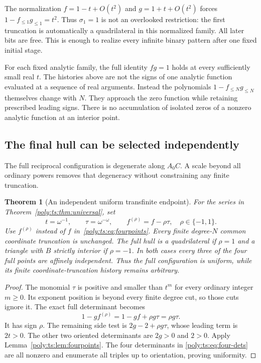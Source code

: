\documentclass[11pt,a4paper]{article}
\numberwithin{equation}{section}
\newtheorem{theorem}{Theorem}[section]
\theoremstyle{plain}
\begin{document}
\begin{remark}
The normalization $f=1-t+O(t^2)$ and $g=1+t+O(t^2)$ forces
$1-f_{\le1}g_{\le1}=t^2$. Thus $\sigma_1=1$ is not an overlooked
restriction: the first truncation is automatically a quadrilateral in
this normalized family. All later bits are free. This is enough to
realize every infinite binary pattern after one fixed initial stage.
\end{remark}

\begin{remark}
For each fixed analytic family, the full identity $fg=1$ holds at every
sufficiently small real $t$. The histories above are not the signs of one
analytic function evaluated at a sequence of real arguments. Instead the
polynomials $1-f_{\le N}g_{\le N}$ themselves change with $N$. They
approach the zero function while retaining prescribed leading signs.
There is no accumulation of isolated zeros of a nonzero analytic function
at an interior point.
\end{remark}

\subsection{The final hull can be selected independently}
The full reciprocal configuration is degenerate along $A_0C$. A scale
beyond all ordinary powers removes that degeneracy without constraining
any finite truncation.

\begin{theorem}[An independent uniform transfinite endpoint]\label{poly:ts:thm:transfinite}
For the series in Theorem~\ref{poly:ts:thm:universal}, set
\[
 t=\omega^{-1},\qquad \tau=\omega^{-\omega},\qquad
 f^{(\rho)}=f-\rho\tau,\quad \rho\in\{-1,1\}.
\]
Use $f^{(\rho)}$ instead of $f$ in~\eqref{poly:ts:eq:fourpoints}. Every finite
degree-$N$ common coordinate truncation is unchanged. The full hull is a
quadrilateral if $\rho=1$ and a triangle with $B$ strictly interior if
$\rho=-1$. In both cases every three of the four full points are affinely
independent. Thus the full configuration is uniform, while its finite
coordinate-truncation history remains arbitrary.
\end{theorem}
\begin{proof}
The monomial $\tau$ is positive and smaller than $t^m$ for every ordinary
integer $m\ge0$. Its exponent position is beyond every finite degree cut,
so those cuts ignore it. The exact full determinant becomes
\[
 1-gf^{(\rho)}=1-gf+\rho g\tau=\rho g\tau.
\]
It has sign $\rho$. The remaining side test is
$2g-2+\rho g\tau$, whose leading term is $2t>0$. The other two
oriented determinants are $2g>0$ and $2>0$. Apply
Lemma~\ref{poly:ts:lem:fourpoints}. The four determinants in
\eqref{poly:ts:eq:four-dets} are all nonzero and enumerate all triples up to
orientation, proving uniformity.
\end{proof}
\end{document}
